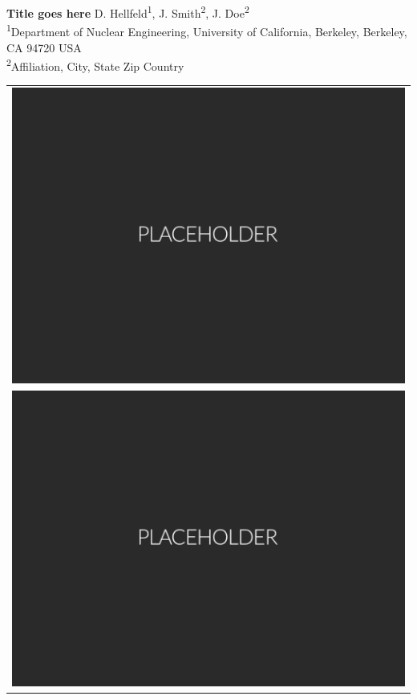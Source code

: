 \documentclass[a0paper,portrait]{baposter}
\begin{document}
\begin{poster}
{\begin{tabular}{c}
  \end{tabular}
}
{
\bf\LARGE{Title goes here}
}
%
{\vspace{0.6em}
  \large{D. Hellfeld\textsuperscript{1}, J. Smith\textsuperscript{2}, J. Doe\textsuperscript{2}} \\[0.4em]

  \small{\textsuperscript{1}Department of Nuclear Engineering, University of California, Berkeley, Berkeley, CA 94720 USA \\[-0.2em]
             \textsuperscript{2}Affiliation, City, State Zip Country \\[-0.2em]}
}
{
  \begin{tabular}{c}
  \includegraphics[height=0.4\headerheight]{Figures/Placeholder.png} \\
  \includegraphics[height=0.4\headerheight]{Figures/Placeholder.png}
  \end{tabular}
}



\end{poster}
\end{document}
